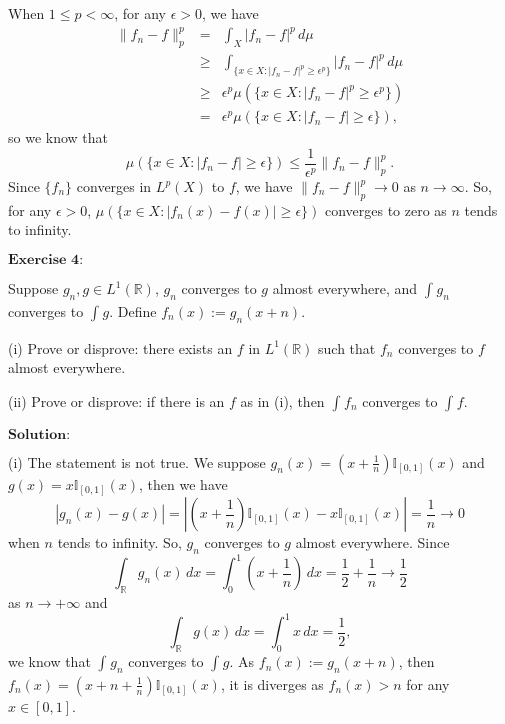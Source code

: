 \documentclass[12pt,a4paper]{ctexart}
\begin{document}
When $1 \leq p < \infty$, for any $\epsilon > 0$, we have
\begin{eqnarray*}
\|f_{n} - f\|_{p}^{p} & = & \int_{X}^{} |f_{n} - f|^{p} \, d \mu \\
& \geq & \int_{\{x \in X: |f_{n} - f|^{p} \geq \epsilon^{p}\}}^{} |f_{n} - f|^{p}  \, d \mu \\
& \geq & \epsilon^{p} \mu(\{x \in X: |f_{n} - f|^{p} \geq \epsilon^{p} \})  \\
& = & \epsilon^{p} \mu(\{x \in X: |f_{n} - f| \geq \epsilon \}),
\end{eqnarray*}
so we know that
\begin{equation*}
   \mu(\{x \in X: |f_{n} - f| \geq \epsilon \}) \leq \frac{1}{\epsilon^{p}} \| f_{n} - f \|_{p}^{p}.
\end{equation*}
Since $\{f_{n}\}$ converges in $L^{p}(X)$ to $f$, we have $\|f_{n} - f \|_{p}^{p} \to 0$ as $n \to \infty$. So, for any $\epsilon > 0$, $\mu(\{x \in X: |f_{n}(x) - f(x)| \geq \epsilon \})$ converges to zero as $n$ tends to infinity.


\vspace{8pt}

$\textbf{Exercise 4:}$

Suppose $g_{n}, g \in L^{1}(\mathbb{R})$, $g_{n}$ converges to $g$ almost everywhere, and $\int_{}^{} g_{n} $ converges to $\int_{}^{} g$. Define $f_{n}(x) := g_{n}(x + n)$.

(i) Prove or disprove: there exists an $f$ in $L^{1}(\mathbb{R})$ such that $f_{n}$ converges to $f$ almost everywhere.

(ii) Prove or disprove: if there is an $f$ as in (i), then $\int_{}^{} f_{n}$ converges to $\int_{}^{} f$.

\vspace{8pt}
$\textbf{Solution:}$

(i) The statement is not true. We suppose $g_{n}(x) = (x + \frac{1}{n}) \mathbb{I}_{[0, 1]} (x)$ and $g(x) = x \mathbb{I}_{[0, 1]} (x)$, then we have
\begin{equation*}
   |g_{n} (x) - g(x) | = | (x + \frac{1}{n}) \mathbb{I}_{[0, 1]} (x) - x \mathbb{I}_{[0, 1]} (x) | = \frac{1}{n} \to 0
\end{equation*}
when $n$ tends to infinity. So, $g_{n}$ converges to $g$ almost everywhere. Since 
\begin{equation*}
   \int_{\mathbb{R}}^{} g_{n}(x) \, d x = \int_{0}^{1} (x + \frac{1}{n}) \, d x = \frac{1}{2} + \frac{1}{n} \to \frac{1}{2} 
\end{equation*}
as $n \to + \infty$ and
\begin{equation*}
   \int_{\mathbb{R}}^{} g (x) \, d x = \int_{0}^{1} x \, d x = \frac{1}{2},
\end{equation*}
we know that $\int_{}^{} g_{n} $ converges to $\int_{}^{} g$. As $f_{n}(x) := g_{n}(x + n)$, then $f_{n} (x) = (x + n + \frac{1}{n}) \mathbb{I}_{[0, 1]} (x)$, it is diverges as $f_{n} (x) > n$ for any $x \in [0, 1]$.
\end{document}
